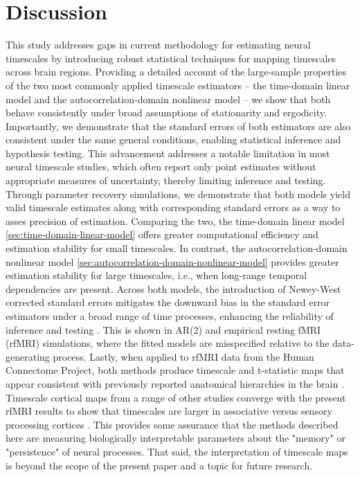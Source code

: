 \documentclass[latex/main.tex]{subfiles}
\begin{document}
\section{Discussion}

This study addresses gaps in current methodology for estimating neural timescales by introducing robust statistical techniques for mapping timescales across brain regions. Providing a detailed account of the large-sample properties of the two most commonly applied timescale estimators -- the time-domain linear model and the autocorrelation-domain nonlinear model -- we show that both behave consistently under broad assumptions of stationarity and ergodicity. Importantly, we demonstrate that the standard errors of both estimators are also consistent under the same general conditions, enabling statistical inference and hypothesis testing. This advancement addresses a notable limitation in most neural timescale studies, which often report only point estimates without appropriate measures of uncertainty, thereby limiting inference and testing.\\

Through parameter recovery simulations, we demonstrate that both models yield valid timescale estimates along with corresponding standard errors as a way to asses precision of estimation. Comparing the two, the time-domain linear model \ref{sec:time-domain-linear-model} offers greater computational efficiency and estimation stability for small timescales. In contrast, the autocorrelation-domain nonlinear model \ref{sec:autocorrelation-domain-nonlinear-model} provides greater estimation stability for large timescales, i.e., when long-range temporal dependencies are present. Across both models, the introduction of Newey-West corrected standard errors mitigates the downward bias in the standard error estimators under a broad range of time processes, enhancing the reliability of inference and testing \citep{newey_simple_1987}. This is shown in AR(2) and empirical resting fMRI (rfMRI) simulations, where the fitted models are misspecified relative to the data-generating process. Lastly, when applied to rfMRI data from the Human Connectome Project, both methods produce timescale and t-statistic maps that appear consistent with previously reported anatomical hierarchies in the brain \citep{van_essen_wu-minn_2013}. Timescale cortical maps from a range of other studies converge with the present rfMRI results to show that timescales are larger in associative versus sensory processing cortices \citep{raut_hierarchical_2020, shafiei_topographic_2020, lurie_cortical_2024, mitra_lag_2014, kaneoke_variance_2012, wengler_distinct_2020, shinn_functional_2023, manea_intrinsic_2022, ito_cortical_2020, muller_core_2020}. This provides some assurance that the methods described here are measuring biologically interpretable parameters about the "memory" or "persistence" of neural processes. That said, the interpretation of timescale maps is beyond the scope of the present paper and a topic for future research.\\
\end{document}
